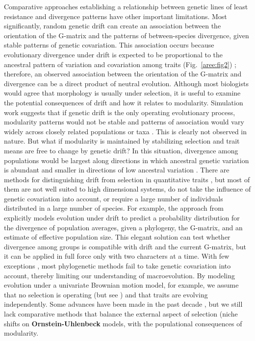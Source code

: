 \begin{refsection}
Comparative approaches establishing a relationship between genetic lines
of least resistance and divergence patterns have other important
limitations. Most significantly, random genetic drift can create an
association between the orientation of the G-matrix and the patterns of
between-species divergence, given stable patterns of genetic
covariation. This association occurs because evolutionary divergence
under drift is expected to be proportional to the ancestral pattern of
variation and covariation among traits
(Fig.~\ref{aree:fig2}) ; therefore, an observed
association between the orientation of the G-matrix and divergence can
be a direct product of neutral evolution. Although most biologists would
agree that morphology is usually under selection, it is useful to
examine the potential consequences of drift and how it relates to
modularity. Simulation work suggests that if genetic drift is the only
operating evolutionary process, modularity patterns would not be stable
and patterns of association would vary widely across closely related
populations or taxa \parencite{Jones2003-jk, Melo2015-bk}. This is
clearly not observed in nature. But what if modularity is maintained by
stabilizing selection and trait means are free to change by genetic
drift? In this situation, divergence among populations would be largest
along directions in which ancestral genetic variation is abundant and
smaller in directions of low ancestral variation \parencite{Arnold2001-lz, Lande1976-xk}. 
There are methods for
distinguishing drift from selection in quantitative traits \parencite{Ackermann2004-ak, Bartoszek2012-mq, Hohenlohe2008-uk, Karhunen2013-dc}, but most of
them are not well suited to high dimensional systems, do not take the
influence of genetic covariation into account, or require a large number
of individuals distributed in a large number of species. For example,
the approach from \textcite{Hohenlohe2008-uk} explicitly models evolution under drift to predict a
probability distribution for the divergence of population averages,
given a phylogeny, the G-matrix, and an estimate of effective population
size. This elegant solution can test whether divergence among groups is
compatible with drift and the current G-matrix, but it can be applied in
full force only with two characters at a time. With few exceptions \parencite{Bartoszek2012-mq, Hohenlohe2008-uk}, most
phylogenetic methods fail to take genetic covariation into account,
thereby limiting our understanding of macroevolution. By modeling
evolution under a univariate Brownian motion model, for example, we
assume that no selection is operating (but see \textcite{Butler2004-jv, Hansen1997-gr})
 and that traits are evolving independently. Some advances have been made in the past decade
\parencite{Bartoszek2012-mq, Cressler2015-xs, Hohenlohe2008-uk}, but we
still lack comparative methods that balance the external aspect of
selection (niche shifts on \textbf{Ornstein-Uhlenbeck} models,
\parencite{Butler2004-jv, Hansen1997-gr} with the populational
consequences of modularity.


\end{refsection}
